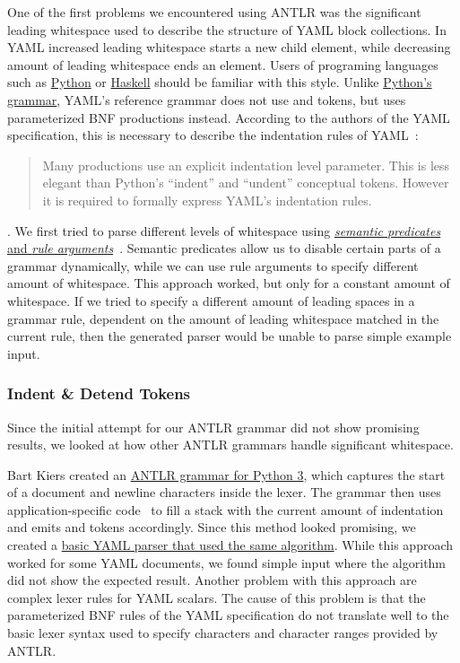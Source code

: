 One of the first problems we encountered using ANTLR was the significant leading whitespace used to describe the structure of YAML block \glspl{collection}. In YAML increased leading whitespace starts a new child element, while decreasing amount of leading whitespace ends an element. Users of programing languages such as \href{https://www.python.org}{Python} or \href{https://www.haskell.org}{Haskell} should be familiar with this style. Unlike \href{https://docs.python.org/3/reference/grammar.html}{Python’s grammar}, YAML’s reference grammar does not use  and  tokens, but uses parameterized \gls{BNF} productions instead. According to the authors of the YAML specification, this is necessary to describe the indentation rules of YAML~\cite{benevansdot2009yaml}:

\begin{quote}
  Many productions use an explicit indentation level parameter. This is less elegant than Python’s “indent” and “undent” conceptual tokens. However it is required to formally express YAML’s indentation rules.
\end{quote}

. We first tried to parse different levels of whitespace using \href{https://github.com/sanssecours/Yan-LR/compare/0b0deae...7d9e64e}{\emph{semantic predicates} and \emph{rule arguments}}~\cite{parr1995antlr}. Semantic predicates allow us to disable certain parts of a grammar dynamically, while we can use rule arguments to specify different amount of whitespace. This approach worked, but only for a constant amount of whitespace. If we tried to specify a different amount of leading spaces in a grammar rule, dependent on the amount of leading whitespace matched in the current rule, then the generated parser would be unable to parse simple example input.

\subsubsection{Indent \& Detend Tokens}

Since the initial attempt for our ANTLR grammar did not show promising results, we looked at how other ANTLR grammars handle significant whitespace.

Bart Kiers created an \href{https://github.com/antlr/grammars-v4/blob/master/python3/Python3.g4}{ANTLR grammar for Python 3}, which captures the start of a document and newline characters inside the lexer. The grammar then uses application-specific code~\cite[p. 48]{parr2013definitive} to fill a stack with the current amount of indentation and emits  and  tokens accordingly. Since this method looked promising, we created a \href{https://github.com/sanssecours/Yan-LR/compare/363be1e...188e5d4}{basic YAML parser that used the same algorithm}. While this approach worked for some YAML documents, we found simple input where the algorithm did not show the expected result. Another problem with this approach are complex lexer rules for YAML scalars. The cause of this problem is that the parameterized BNF rules of the YAML specification do not translate well to the basic lexer syntax used to specify characters and character ranges provided by ANTLR.

